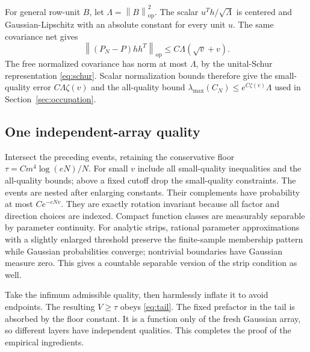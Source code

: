\documentclass[11pt]{article}
\newcommand{\op}{\mathrm{op}}\newcommand{\F}{\mathrm F}
\newcommand{\norm}[1]{\left\lVert#1\right\rVert}
\begin{document}
For general row-unit $B$, let $\Lambda=\norm B_\op^2$. The scalar $u^Th/\sqrt\Lambda$ is centered and Gaussian-Lipschitz with an absolute constant for every unit $u$. The same covariance net gives
\begin{equation}
 \norm{(P_N-P)hh^T}_\op\le C\Lambda(\sqrt v+v).
\end{equation}
The free normalized covariance has norm at most $\Lambda$, by the unital-Schur representation \eqref{eq:schur}. Scalar normalization bounds therefore give the small-quality error $C\Lambda\zeta(v)$ and the all-quality bound $\lambda_{\max}(C_N)\le e^{C\zeta(v)}\Lambda$ used in Section~\ref{sec:occupation}.

\subsection{One independent-array quality}
Intersect the preceding events, retaining the conservative floor $\tau=Cm^4\log(eN)/N$. For small $v$ include all small-quality inequalities and the all-quality bounds; above a fixed cutoff drop the small-quality constraints. The events are nested after enlarging constants. Their complements have probability at most $Ce^{-cNv}$. They are exactly rotation invariant because all factor and direction choices are indexed. Compact function classes are measurably separable by parameter continuity. For analytic strips, rational parameter approximations with a slightly enlarged threshold preserve the finite-sample membership pattern while Gaussian probabilities converge; nontrivial boundaries have Gaussian measure zero. This gives a countable separable version of the strip condition as well.

Take the infimum admissible quality, then harmlessly inflate it to avoid endpoints. The resulting $V\ge\tau$ obeys \eqref{eq:tail}. The fixed prefactor in the tail is absorbed by the floor constant. It is a function only of the fresh Gaussian array, so different layers have independent qualities. This completes the proof of the empirical ingredients.
\end{document}
